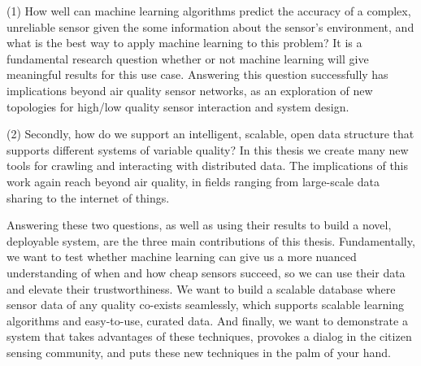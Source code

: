 (1) How well can machine learning algorithms predict the accuracy of a complex, unreliable sensor given the some information about the sensor's environment, and what is the best way to apply machine learning to this problem?  It is a fundamental research question whether or not machine learning will give meaningful results for this use case.  Answering this question successfully has implications beyond air quality sensor networks, as an exploration of new topologies for high/low quality sensor interaction and system design.

(2) Secondly, how do we support an intelligent, scalable, open data structure that supports different systems of variable quality?  In this thesis we create many new tools for crawling and interacting with distributed data.  The implications of this work again reach beyond air quality, in fields ranging from large-scale data sharing to the internet of things.

Answering these two questions, as well as using their results to build a novel, deployable system, are the three main contributions of this thesis.  Fundamentally, we want to test whether machine learning can give us a more nuanced understanding of when and how cheap sensors succeed, so we can use their data and elevate their trustworthiness.  We want to build a scalable database where sensor data of any quality co-exists seamlessly, which supports scalable learning algorithms and easy-to-use, curated data.  And finally, we want to demonstrate a system that takes advantages of these techniques, provokes a dialog in the citizen sensing community, and puts these new techniques in the palm of your hand.




%

